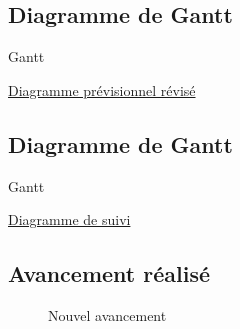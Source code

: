 \documentclass{beamer}
\begin{document}
	\subsection{Diagramme de Gantt}
	\begin{frame}{Gantt}
		\begin{center}
			\href{run:Gantt_ProjetDiscretConception.gif}{Diagramme prévisionnel révisé}
		\end{center}
	\end{frame}

	\subsection{Diagramme de Gantt}
	\begin{frame}{Gantt}
		\begin{center}
			\href{run:Gantt_ProjetDiscretConception.gif}{Diagramme de suivi}
		\end{center}
	\end{frame}

	\subsection{Avancement réalisé}
	\begin{frame}{\subsecname}
		\begin{figure}
			Nouvel avancement
		\end{figure}
	\end{frame}


\end{document}
